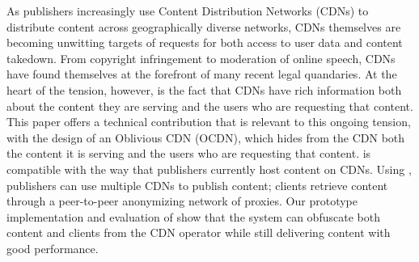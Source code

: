 As publishers increasingly use Content Distribution Networks
(CDNs) to distribute content across geographically diverse networks, 
CDNs themselves are becoming unwitting targets of requests for both
access to user data and content takedown. From copyright infringement to
moderation of online speech, CDNs have found themselves at the forefront of
many recent legal quandaries. At the heart of the tension, however, is the fact
that CDNs have rich information both about the content they are serving and the
users who are requesting that content. 
This paper offers a technical contribution that is relevant to this ongoing tension,
with the design of an Oblivious CDN (OCDN), which hides from the CDN both the content
it is serving and the users who are requesting that content. \system{} is compatible with the way that publishers
currently host content on CDNs. Using \system{}, publishers can use multiple CDNs
to publish content; clients retrieve content through a peer-to-peer anonymizing network
of proxies.
Our prototype implementation and
evaluation of \system{} show that the system can obfuscate both content and clients
from the CDN operator while still delivering content with good performance.%

